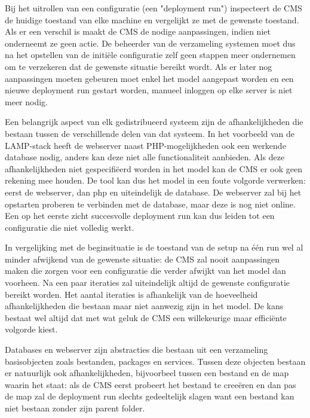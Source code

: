 Bij het uitrollen van een configuratie (een "deployment run") inspecteert de CMS de huidige toestand van elke machine en vergelijkt ze met de gewenste toestand.
Als er een verschil is maakt de CMS de nodige aanpassingen, indien niet onderneemt ze geen actie.
De beheerder van de verzameling systemen moet dus na het opstellen van de initi\"ele configuratie zelf geen stappen meer ondernemen om te verzekeren dat de gewenste situatie bereikt wordt.
Als er later nog aanpassingen moeten gebeuren moet enkel het model aangepast worden en een nieuwe deployment run gestart worden, manueel inloggen op elke server is niet meer nodig.


Een belangrijk aspect van elk gedistribueerd systeem zijn de afhankelijkheden die bestaan tussen de verschillende delen van dat systeem.
In het voorbeeld van de LAMP-stack heeft de webserver naast PHP-mogelijkheden ook een werkende database nodig, anders kan deze niet alle functionaliteit aanbieden.
Als deze afhankelijkheden niet gespecifi\"eerd worden in het model kan de CMS er ook geen rekening mee houden.
De tool kan dus het model in een foute volgorde verwerken: eerst de webserver, dan php en uiteindelijk de database.
De webserver zal bij het opstarten proberen te verbinden met de database, maar deze is nog niet online.
Een op het eerste zicht succesvolle deployment run kan dus leiden tot een configuratie die niet volledig werkt.

In vergelijking met de beginsituatie is de toestand van de setup na \'e\'en run wel al minder afwijkend van de gewenste situatie:
de CMS zal nooit aanpassingen maken die zorgen voor een configuratie die verder afwijkt van het model dan voorheen.
Na een paar iteraties zal uiteindelijk altijd de gewenste configuratie bereikt worden.
Het aantal iteraties is afhankelijk van de hoeveelheid afhankelijkheden die bestaan maar niet aanwezig zijn in het model.
De kans bestaat wel altijd dat met wat geluk de CMS een willekeurige maar effici\"ente volgorde kiest.

Databases en webserver zijn abstracties die bestaan uit een verzameling basisobjecten zoals bestanden, packages en services.
Tussen deze objecten bestaan er natuurlijk ook afhankelijkheden, bijvoorbeel tussen een bestand en de map waarin het staat:
als de CMS eerst probeert het bestand te cree\"eren en dan pas de map zal de deployment run slechts gedeeltelijk slagen want een bestand kan niet bestaan zonder zijn parent folder.

